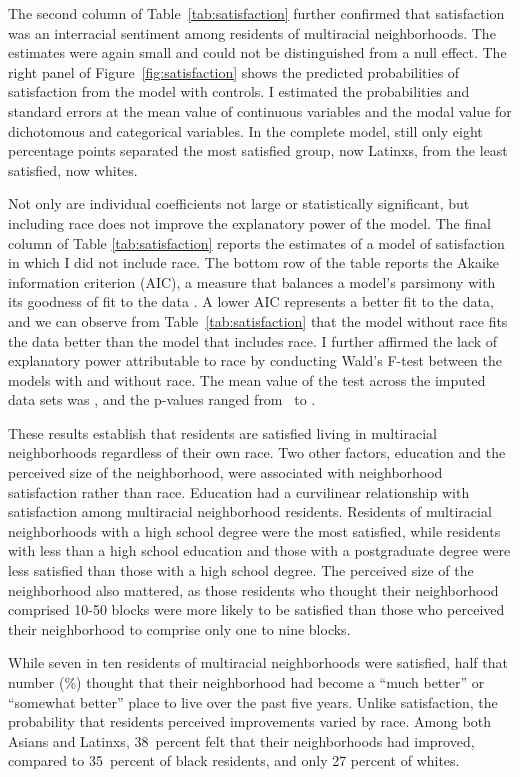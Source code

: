 \documentclass{baderart}
\begin{document}
The second column of Table~\ref{tab:satisfaction} further confirmed that satisfaction was an interracial sentiment among residents of multiracial neighborhoods. The estimates were again small and could not be distinguished from a null effect. The right panel of Figure~\ref{fig:satisfaction} shows the predicted probabilities of satisfaction from the model with controls. I estimated the probabilities and standard errors at the mean value of continuous variables and the modal value for dichotomous and categorical variables. In the complete model, still only eight percentage points separated the most satisfied group, now Latinxs, from the least satisfied, now whites. 

Not only are individual coefficients not large or statistically significant, but including race does not improve the explanatory power of the model. The final column of Table \ref{tab:satisfaction} reports the estimates of a model of satisfaction in which I did not include race. The bottom row of the table reports the Akaike information criterion (AIC), a measure that balances a model's parsimony with its goodness of fit to the data \citep{akaike_new_1974}. A lower AIC represents a better fit to the data, and we can observe from Table~\ref{tab:satisfaction} that the model without race fits the data better than the model that includes race. I further affirmed the lack of explanatory power attributable to race by conducting Wald's F-test between the models with and without race. The mean value of the test across the imputed data sets was \satWaldF, and the p-values ranged from \satWaldpMin\ to \satWaldpMax.

These results establish that residents are satisfied living in multiracial neighborhoods regardless of their own race. Two other factors, education and the perceived size of the neighborhood, were associated with neighborhood satisfaction rather than race. Education had a curvilinear relationship with satisfaction among multiracial neighborhood residents. Residents of multiracial neighborhoods with a high school degree were the most satisfied, while residents with less than a high school education and those with a postgraduate degree were less satisfied than those with a high school degree. The perceived size of the neighborhood also mattered, as those residents who thought their neighborhood comprised 10-50 blocks were more likely to be satisfied than those who perceived their neighborhood to comprise only one to nine blocks. 

While seven in ten residents of multiracial neighborhoods were satisfied, half that number (\meanimproved \%) thought that their neighborhood had become a ``much better'' or ``somewhat better'' place to live over the past five years. Unlike satisfaction, the probability that residents perceived improvements varied by race. Among both Asians and Latinxs, 38~percent felt that their neighborhoods had improved, compared to 35~percent of black residents, and only 27 percent of whites.
\end{document}
